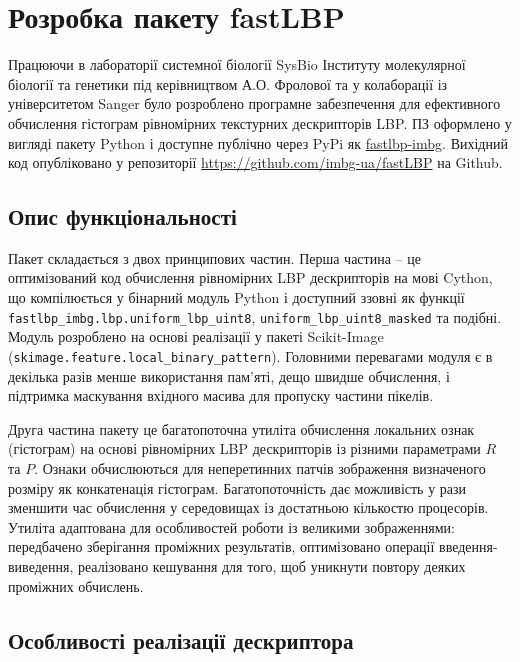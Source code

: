\section{Розробка пакету fastLBP}\label{section2.2}

Працюючи в лабораторії системної біології SysBio Інституту молекулярної біології та генетики під керівництвом А.О. Фролової 
та у колаборації із університетом Sanger було розроблено програмне забезпечення для ефективного обчислення гістограм 
рівномірних текстурних дескрипторів LBP.
ПЗ оформлено у вигляді пакету Python і доступне публічно через PyPi як \href{https://pypi.org/project/fastlbp-imbg/}{fastlbp-imbg}.
Вихідний код опубліковано у репозиторії \url{https://github.com/imbg-ua/fastLBP} на Github.

\subsection{Опис функціональності}\label{section2.2a}\hfill

Пакет складається з двох принципових частин. 
Перша частина -- це оптимізований код обчислення рівномірних LBP дескрипторів на мові Cython, що компілюється у бінарний модуль Python 
і доступний ззовні як функції \verb|fastlbp_imbg.lbp.uniform_lbp_uint8|, \verb|uniform_lbp_uint8_masked| та подібні.
Модуль розроблено на основі реалізації у пакеті Scikit-Image (\verb|skimage.feature.local_binary_pattern|).
Головними перевагами модуля є в декілька разів менше використання пам'яті, дещо швидше обчислення, і підтримка маскування вхідного масива для 
пропуску частини пікелів.

Друга частина пакету це багатопоточна утиліта обчислення локальних ознак (гістограм) на основі рівномірних LBP дескрипторів із різними параметрами $R$ та $P$.
Ознаки обчислюються для неперетинних патчів зображення визначеного розміру як конкатенація гістограм.
Багатопоточність дає можливість у рази зменшити час обчислення у середовищах із достатньою кількостю процесорів.
Утиліта адаптована для особливостей роботи із великими зображеннями: 
передбачено зберігання проміжних результатів, оптимізовано операції введення-виведення, 
реалізовано кешування для того, щоб уникнути повтору деяких проміжних обчислень.

\subsection{Особливості реалізації дескриптора}\label{section2.2b}\hfill

